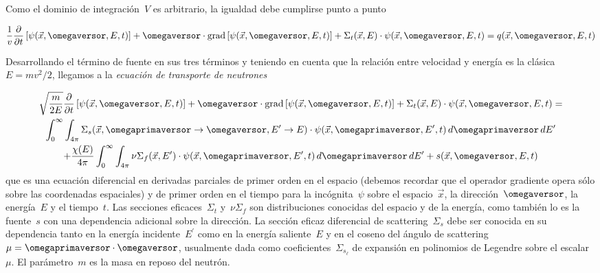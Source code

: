 Como el dominio de integración~$V$ es arbitrario, la igualdad debe cumplirse punto a punto

\begin{equation}
\label{eq:transporteq}
 \frac{1}{v} \frac{\partial}{\partial t} \left[ \psi(\vec{x}, \omegaversor, E, t) \right]
 + \omegaversor \cdot \text{grad} \left[ \psi(\vec{x}, \omegaversor, E, t) \right]
 + \Sigma_t(\vec{x}, E) \cdot \psi(\vec{x}, \omegaversor, E, t)
 = q(\vec{x}, \omegaversor, E, t)
\end{equation}

Desarrollando el término de fuente en sus tres términos y teniendo en cuenta que la relación entre velocidad y energía es la clásica~$E=mv^2/2$, llegamos a la \emph{ecuación de transporte de neutrones}

\begin{multline}
\label{eq:transporte}
 \sqrt{\frac{m}{2E}} \frac{\partial}{\partial t} \left[ \psi(\vec{x}, \omegaversor, E, t) \right]
 + \omegaversor \cdot \text{grad} \left[ \psi(\vec{x}, \omegaversor, E, t) \right]
 + \Sigma_t(\vec{x}, E) \cdot \psi(\vec{x}, \omegaversor, E, t) = \\
 \int_{0}^{\infty} \int_{4\pi} \Sigma_s(\vec{x}, \omegaprimaversor \rightarrow \omegaversor, E^\prime \rightarrow E) \cdot \psi(\vec{x}, \omegaprimaversor, E^\prime, t) \, d\omegaprimaversor \, dE^\prime \\
+ \frac{\chi(E)}{4\pi} \int_{0}^{\infty} \int_{4\pi} \nu\Sigma_f(\vec{x}, E^\prime) \cdot \psi(\vec{x}, \omegaprimaversor, E^\prime, t) \, d\omegaprimaversor \, dE^\prime 
+ s(\vec{x}, \omegaversor, E, t)
\end{multline}
%
que es una ecuación diferencial en derivadas parciales de primer orden en el espacio (debemos recordar que el operador gradiente opera sólo sobre las coordenadas espaciales) y de primer orden en el tiempo para la incógnita~$\psi$ sobre el espacio~$\vec{x}$, la dirección~$\omegaversor$, la energía~$E$ y el tiempo~$t$. Las secciones eficaces~$\Sigma_t$ y~$\nu\Sigma_f$ son distribuciones conocidas del espacio y de la energía, como también lo es la fuente~$s$ con una dependencia adicional sobre la dirección. La sección eficaz diferencial de scattering~$\Sigma_s$ debe ser conocida en su dependencia tanto en la energía incidente~$E^\prime$ como en la energía saliente~$E$ y en el coseno del ángulo de scattering~$\mu = \omegaprimaversor \cdot \omegaversor$, usualmente dada como coeficientes~$\Sigma_{s_\ell}$ de expansión en polinomios de Legendre sobre el escalar~$\mu$. El parámetro~$m$ es la masa en reposo del neutrón.


